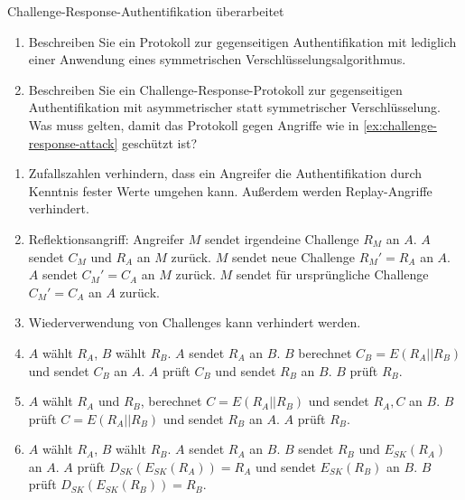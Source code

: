 \documentclass{article}
\begin{document}
\begin{exercise}{Challenge-Response-Authentifikation überarbeitet}
\begin{enumerate}
    \item Beschreiben Sie ein Protokoll zur gegenseitigen Authentifikation mit lediglich einer Anwendung eines symmetrischen Verschlüsselungsalgorithmus.
    \item Beschreiben Sie ein Challenge-Response-Protokoll zur gegenseitigen Authentifikation mit asymmetrischer statt symmetrischer Verschlüsselung. Was muss gelten, damit das Protokoll gegen Angriffe wie in \ref{ex:challenge-response-attack} geschützt ist?
  \end{enumerate}

  \begin{solution}
    \begin{enumerate}
      \item Zufallszahlen verhindern, dass ein Angreifer die Authentifikation durch Kenntnis fester Werte umgehen kann. Außerdem werden Replay-Angriffe verhindert.
      \item Reflektionsangriff: Angreifer $M$ sendet irgendeine Challenge $R_M$ an $A$. $A$ sendet $C_M$ und $R_A$ an $M$ zurück. $M$ sendet neue Challenge $R_M'=R_A$ an $A$. $A$ sendet $C_M'=C_A$ an $M$ zurück. $M$ sendet für ursprüngliche Challenge $C_M'=C_A$ an $A$ zurück.
      \item Wiederverwendung von Challenges kann verhindert werden.
      \item $A$ wählt $R_A$, $B$ wählt $R_B$. $A$ sendet $R_A$ an $B$. $B$ berechnet $C_B=E(R_A || R_B)$ und sendet $C_B$ an $A$. $A$ prüft $C_B$ und sendet $R_B$ an $B$. $B$ prüft $R_B$.
      \item $A$ wählt $R_A$ und $R_B$, berechnet $C=E(R_A || R_B)$ und sendet $R_A, C$ an $B$. $B$ prüft $C=E(R_A || R_B)$ und sendet $R_B$ an $A$. $A$ prüft $R_B$.
      \item $A$ wählt $R_A$, $B$ wählt $R_B$. $A$ sendet $R_A$ an $B$. $B$ sendet $R_B$ und $E_{SK}(R_A)$ an $A$. $A$ prüft $D_{SK}(E_{SK}(R_A))=R_A$ und sendet $E_{SK}(R_B)$ an $B$. $B$ prüft $D_{SK}(E_{SK}(R_B))=R_B$.
    \end{enumerate}
  \end{solution}
\end{exercise}
\end{document}
